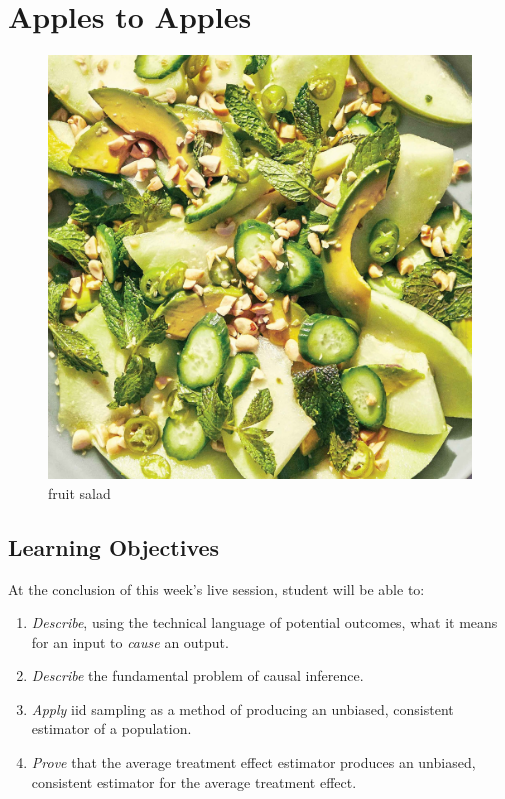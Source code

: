 \documentclass[
]{article}
\providecommand{\tightlist}{%
  \setlength{\itemsep}{0pt}\setlength{\parskip}{0pt}}
\begin{document}
\hypertarget{apples-to-apples}{%
\section{Apples to Apples}\label{apples-to-apples}}

\begin{figure}
\centering
\includegraphics{./images/honeydew-salad-with-ginger-dressing-and-peanuts.jpeg}
\caption{fruit salad}
\end{figure}

\hypertarget{learning-objectives-1}{%
\subsection{Learning Objectives}\label{learning-objectives-1}}

At the conclusion of this week's live session, student will be able to:

\begin{enumerate}
\def\labelenumi{\arabic{enumi}.}
\tightlist
\item
  \emph{Describe}, using the technical language of potential outcomes, what it means for an input to \emph{cause} an output.
\item
  \emph{Describe} the fundamental problem of causal inference.
\item
  \emph{Apply} iid sampling as a method of producing an unbiased, consistent estimator of a population.
\item
  \emph{Prove} that the average treatment effect estimator produces an unbiased, consistent estimator for the average treatment effect.
\end{enumerate}
\end{document}
